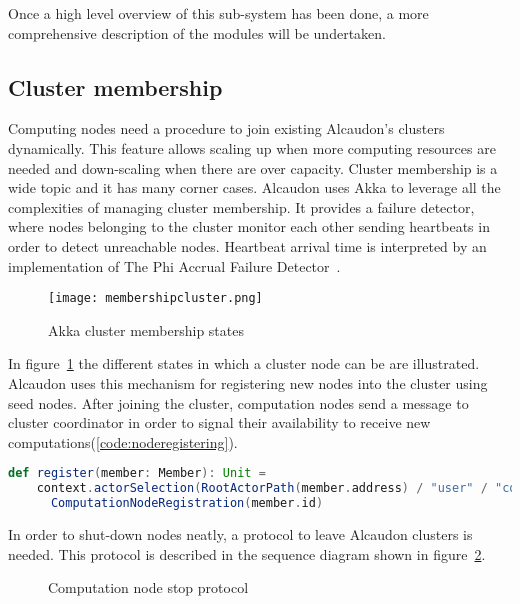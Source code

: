 Once a high level overview of this sub-system has been done, a more
comprehensive description of the modules will be undertaken.

\subsection{Cluster membership}

Computing nodes need a procedure to join existing Alcaudon's clusters
dynamically. This feature allows scaling up when more computing resources are
needed and down-scaling when there are over capacity. Cluster membership is a
wide topic and it has many corner cases. Alcaudon uses Akka to leverage all the
complexities of managing cluster membership. It provides a failure detector,
where nodes belonging to the cluster monitor each other sending heartbeats in
order to detect unreachable nodes. Heartbeat arrival time is interpreted by an
implementation of The Phi Accrual Failure Detector~\cite{phifailure}.

\begin{figure}[!h]
\begin{center}
\texttt{[image: membershipcluster.png]}
\caption{Akka cluster membership states~\cite{akkastates}}
\label{fig:statescluster}
\end{center}
\end{figure}

In figure~\ref{fig:statescluster} the different states in which a cluster node
can be are illustrated. Alcaudon uses this mechanism for registering new
nodes into the cluster using seed nodes. After joining the cluster, computation
nodes send a message to cluster coordinator in order to signal their
availability to receive new computations(\ref{code:noderegistering}).

\begin{lstlisting}[language=scala, frame=trBL, label=code:noderegistering, float=ht, caption = {Compute node registration}]
def register(member: Member): Unit =
    context.actorSelection(RootActorPath(member.address) / "user" / "coordinator") !
      ComputationNodeRegistration(member.id)
\end{lstlisting}

In order to shut-down nodes neatly, a protocol to leave Alcaudon clusters is
needed. This protocol is described in the sequence diagram shown in
figure~\ref{fig:stopprotocol}.

\begin{figure}[!h]
  \centering
  \scalebox{0.45}{
    
  }
  \caption{Computation node stop protocol}
  \label{fig:stopprotocol}
\end{figure}

